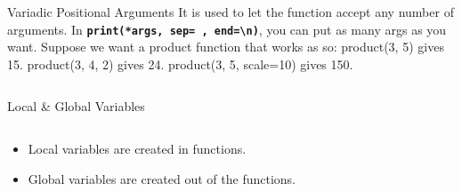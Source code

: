         \begin{frame}{Variadic Positional Arguments}
            It is used to let the function accept any number of arguments.
            \newline
            In \textbf{\texttt{print(*args, sep=\textquotesingle \ \textquotesingle, end=\textquotesingle \textbackslash n\textquotesingle )}}, 
            you can put as many args as you want.
            \newline 
            \newline Suppose we want a product function that works as so:
            \newline product(3, 5) gives 15.
            \newline product(3, 4, 2) gives 24.
            \newline product(3, 5, scale=10) gives 150.
            \newline 
            \pause
            \inputminted[frame=single,framesep=2pt, lastline=15]{python3}{code-examples/variadic.py}
        \end{frame}

        \begin{frame}{Local \& Global Variables}
            \begin{columns}
                \begin{column}{0.50\textwidth}
                    \begin{itemize}
                        \item Local variables are created in functions.
                        \item Global variables are created out of the functions.
                    \end{itemize}
                    \inputminted[frame=single,framesep=2pt, lastline=15]{python3}{code-examples/var.py}
                \end{column}
                \begin{column}{0.50\textwidth}
                    \pause
                    \inputminted[frame=single,framesep=2pt, lastline=15]{python3}{code-examples/var2.py}                    
                    \pause
                    \inputminted[frame=single,framesep=2pt, lastline=15]{python3}{code-examples/var3.py}                    
                \end{column}
            \end{columns}
        \end{frame}

